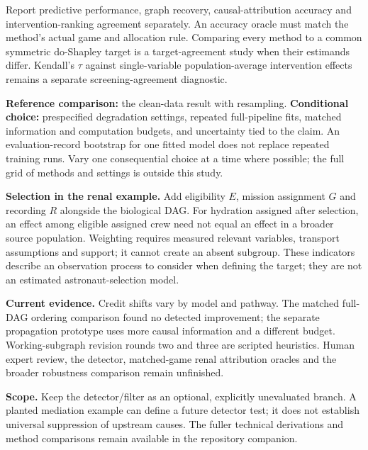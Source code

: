 \documentclass[11pt,letterpaper]{article}
\providecommand{\SupplementRoot}{}
\begin{document}
Report predictive performance, graph recovery, causal-attribution accuracy and intervention-ranking agreement separately. An accuracy oracle must match the method's actual game and allocation rule. Comparing every method to a common symmetric do-Shapley target is a target-agreement study when their estimands differ. Kendall's $\tau$ against single-variable population-average intervention effects remains a separate screening-agreement diagnostic.

\textbf{Reference comparison:} the clean-data result with resampling. \textbf{Conditional choice:} prespecified degradation settings, repeated full-pipeline fits, matched information and computation budgets, and uncertainty tied to the claim. An evaluation-record bootstrap for one fitted model does not replace repeated training runs. Vary one consequential choice at a time where possible; the full grid of methods and settings is outside this study.

\textbf{Selection in the renal example.} Add eligibility $E$, mission assignment $G$ and recording $R$ alongside the biological DAG. For hydration assigned after selection, an effect among eligible assigned crew need not equal an effect in a broader source population. Weighting requires measured relevant variables, transport assumptions and support; it cannot create an absent subgroup. These indicators describe an observation process to consider when defining the target; they are not an estimated astronaut-selection model.

\textbf{Current evidence.} Credit shifts vary by model and pathway. The matched full-DAG ordering comparison found no detected improvement; the separate propagation prototype uses more causal information and a different budget. Working-subgraph revision rounds two and three are scripted heuristics. Human expert review, the detector, matched-game renal attribution oracles and the broader robustness comparison remain unfinished.

\textbf{Scope.} Keep the detector/filter as an optional, explicitly unevaluated branch. A planted mediation example can define a future detector test; it does not establish universal suppression of upstream causes. The fuller technical derivations and method comparisons remain available in the repository companion.

\clearpage
\small


\end{document}
